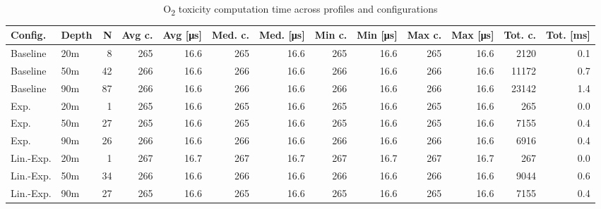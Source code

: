 \begin{landscape}
\begin{table}[p]
\centering
\small
\renewcommand{\arraystretch}{1.15}
\begin{tabular}{llrrrrrrrrrrr}
\toprule
Config. & Depth & N & Avg c. & Avg [\si{\micro\second}] & Med. c. & Med. [\si{\micro\second}] & Min c. & Min [\si{\micro\second}] & Max c. & Max [\si{\micro\second}] & Tot. c. & Tot. [\si{\milli\second}] \\
\midrule
Baseline & 20m & 8 & 265 & 16.6 & 265 & 16.6 & 265 & 16.6 & 265 & 16.6 & 2120 & 0.1 \\
Baseline & 50m & 42 & 266 & 16.6 & 266 & 16.6 & 266 & 16.6 & 266 & 16.6 & 11172 & 0.7 \\
Baseline & 90m & 87 & 266 & 16.6 & 266 & 16.6 & 266 & 16.6 & 266 & 16.6 & 23142 & 1.4 \\
Exp. & 20m & 1 & 265 & 16.6 & 265 & 16.6 & 265 & 16.6 & 265 & 16.6 & 265 & 0.0 \\
Exp. & 50m & 27 & 265 & 16.6 & 265 & 16.6 & 265 & 16.6 & 265 & 16.6 & 7155 & 0.4 \\
Exp. & 90m & 26 & 266 & 16.6 & 266 & 16.6 & 266 & 16.6 & 266 & 16.6 & 6916 & 0.4 \\
Lin.-Exp. & 20m & 1 & 267 & 16.7 & 267 & 16.7 & 267 & 16.7 & 267 & 16.7 & 267 & 0.0 \\
Lin.-Exp. & 50m & 34 & 266 & 16.6 & 266 & 16.6 & 266 & 16.6 & 266 & 16.6 & 9044 & 0.6 \\
Lin.-Exp. & 90m & 27 & 265 & 16.6 & 265 & 16.6 & 265 & 16.6 & 265 & 16.6 & 7155 & 0.4 \\
\bottomrule
\end{tabular}
\caption{O\textsubscript{2} toxicity computation time across profiles and configurations}
\label{tab:timing_o2tox}
\end{table}
\end{landscape}
